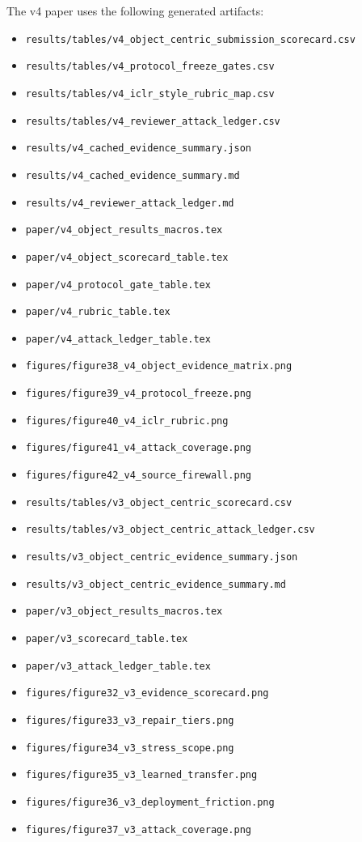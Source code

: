 \documentclass[10pt]{article}
\begin{document}
The v4 paper uses the following generated artifacts:
\begin{itemize}
  \item \texttt{results/tables/v4\_object\_centric\_submission\_scorecard.csv}
  \item \texttt{results/tables/v4\_protocol\_freeze\_gates.csv}
  \item \texttt{results/tables/v4\_iclr\_style\_rubric\_map.csv}
  \item \texttt{results/tables/v4\_reviewer\_attack\_ledger.csv}
  \item \texttt{results/v4\_cached\_evidence\_summary.json}
  \item \texttt{results/v4\_cached\_evidence\_summary.md}
  \item \texttt{results/v4\_reviewer\_attack\_ledger.md}
  \item \texttt{paper/v4\_object\_results\_macros.tex}
  \item \texttt{paper/v4\_object\_scorecard\_table.tex}
  \item \texttt{paper/v4\_protocol\_gate\_table.tex}
  \item \texttt{paper/v4\_rubric\_table.tex}
  \item \texttt{paper/v4\_attack\_ledger\_table.tex}
  \item \texttt{figures/figure38\_v4\_object\_evidence\_matrix.png}
  \item \texttt{figures/figure39\_v4\_protocol\_freeze.png}
  \item \texttt{figures/figure40\_v4\_iclr\_rubric.png}
  \item \texttt{figures/figure41\_v4\_attack\_coverage.png}
  \item \texttt{figures/figure42\_v4\_source\_firewall.png}
  \item \texttt{results/tables/v3\_object\_centric\_scorecard.csv}
  \item \texttt{results/tables/v3\_object\_centric\_attack\_ledger.csv}
  \item \texttt{results/v3\_object\_centric\_evidence\_summary.json}
  \item \texttt{results/v3\_object\_centric\_evidence\_summary.md}
  \item \texttt{paper/v3\_object\_results\_macros.tex}
  \item \texttt{paper/v3\_scorecard\_table.tex}
  \item \texttt{paper/v3\_attack\_ledger\_table.tex}
  \item \texttt{figures/figure32\_v3\_evidence\_scorecard.png}
  \item \texttt{figures/figure33\_v3\_repair\_tiers.png}
  \item \texttt{figures/figure34\_v3\_stress\_scope.png}
  \item \texttt{figures/figure35\_v3\_learned\_transfer.png}
  \item \texttt{figures/figure36\_v3\_deployment\_friction.png}
  \item \texttt{figures/figure37\_v3\_attack\_coverage.png}
\end{itemize}
\end{document}
